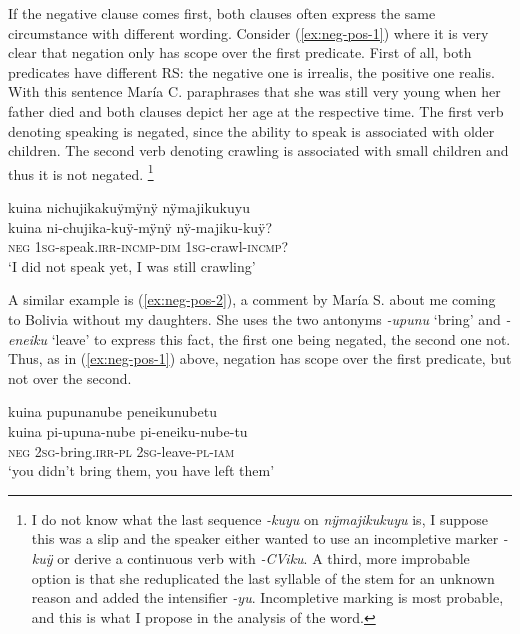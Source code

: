 If the negative clause comes first, both clauses often express the same circumstance with different wording. Consider (\ref{ex:neg-pos-1}) where it is very clear that negation only has scope over the first predicate. First of all, both predicates have different RS: the negative one is irrealis, the positive one realis. With this sentence María C. paraphrases that she was still very young when her father died and both clauses depict her age at the respective time. The first verb denoting speaking is negated, since the ability to speak is associated with older children. The second verb denoting crawling is associated with small children and thus it is not negated. \footnote{I do not know what the last sequence \textit{-kuyu} on \textit{nÿmajikukuyu} is, I suppose this was a slip and the speaker either wanted to use an incompletive marker \textit{-kuÿ} or derive a continuous verb with \textit{-CViku}. A third, more improbable option is that she reduplicated the last syllable of the stem for an unknown reason and added the intensifier \textit{-yu}. Incompletive marking is most probable, and this is what I propose in the analysis of the word.}

\newpage
\ea\label{ex:neg-pos-1}
\begingl
\glpreamble kuina nichujikakuÿmÿnÿ nÿmajikukuyu\\
\gla kuina ni-chujika-kuÿ-mÿnÿ nÿ-majiku-kuÿ?\\
\glb \textsc{neg} 1\textsc{sg}-speak.\textsc{irr}-\textsc{incmp}-\textsc{dim} 1\textsc{sg}-crawl-\textsc{incmp}?\\
\glft ‘I did not speak yet, I was still crawling’
\endgl
\trailingcitation{[cux-c120414ls-2.278]}
\xe


A similar example is (\ref{ex:neg-pos-2}), a comment by María S. about me coming to Bolivia without my daughters. She uses the two antonyms \textit{-upunu} ‘bring’ and \textit{-eneiku} ‘leave’ to express this fact, the first one being negated, the second one not. Thus, as in (\ref{ex:neg-pos-1}) above, negation has scope over the first predicate, but not over the second.

\ea\label{ex:neg-pos-2}
\begingl
\glpreamble kuina pupunanube peneikunubetu\\
\gla kuina pi-upuna-nube pi-eneiku-nube-tu\\
\glb \textsc{neg} 2\textsc{sg}-bring.\textsc{irr}-\textsc{pl} 2\textsc{sg}-leave-\textsc{pl}-\textsc{iam}\\
\glft ‘you didn’t bring them, you have left them’
\endgl
\trailingcitation{[rmx-e150922l.079]}
\xe


